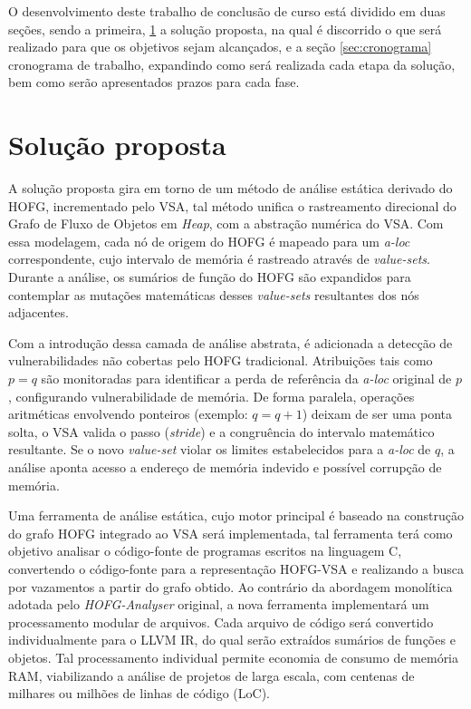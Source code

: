 \documentclass[
    12pt,                %
    openright,           %
    oneside,             %
    a4paper,             %
    english,             %
    brazil               %
]{abntex2}
\begin{document}
O desenvolvimento deste trabalho de conclusão de curso está dividido em duas seções, sendo a primeira, \ref{sec:solucao} a solução proposta, na qual é discorrido o que será realizado para que os objetivos sejam alcançados, e a seção \ref{sec:cronograma} cronograma de trabalho, expandindo como será realizada cada etapa da solução, bem como serão apresentados prazos para cada fase.

\section{Solução proposta}
\label{sec:solucao}

\par
A solução proposta gira em torno de um método de análise estática derivado do HOFG, incrementado pelo VSA, tal método unifica o rastreamento direcional do Grafo de Fluxo de Objetos em \textit{Heap}, com a abstração numérica do VSA. Com essa modelagem, cada nó de origem do HOFG é mapeado para um \textit{a-loc} correspondente, cujo intervalo de memória é rastreado através de \textit{value-sets}. 
Durante a análise, os sumários de função do HOFG são expandidos para contemplar as mutações matemáticas desses \textit{value-sets} resultantes dos nós adjacentes.

\par
Com a introdução dessa camada de análise abstrata, é adicionada a detecção de vulnerabilidades não cobertas pelo HOFG tradicional. Atribuições tais como $p = q$ são monitoradas para identificar a perda de referência da \textit{a-loc} original de $p$, configurando vulnerabilidade de memória. De forma paralela, operações aritméticas envolvendo ponteiros (exemplo: $q = q + 1$) deixam de ser uma ponta solta, o VSA valida o passo (\textit{stride})
e a congruência do intervalo matemático resultante. Se o novo \textit{value-set} violar os limites estabelecidos para a \textit{a-loc} de $q$, a análise aponta acesso a endereço de memória indevido e possível corrupção de memória.

\par
Uma ferramenta de análise estática, cujo motor principal é baseado na construção do grafo HOFG integrado ao VSA será implementada, tal ferramenta terá como objetivo analisar o código-fonte de programas escritos na linguagem C, convertendo o código-fonte para a representação HOFG-VSA e realizando a busca por vazamentos a partir do grafo obtido. 
Ao contrário da abordagem monolítica adotada pelo \textit{HOFG-Analyser} original, a nova ferramenta implementará um processamento modular de arquivos. Cada arquivo de código será convertido individualmente para o LLVM IR, do qual serão extraídos sumários de funções e objetos. Tal processamento individual permite economia de consumo de memória RAM, viabilizando a análise de projetos de larga escala, com centenas de milhares ou milhões de linhas de código (LoC).
\end{document}
